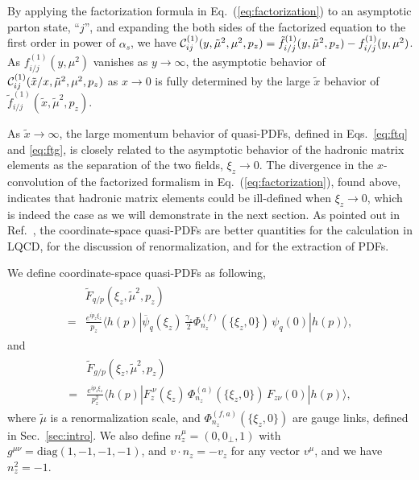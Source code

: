 \documentclass[twocolumn,aps,prd,superscriptaddress,nofootinbib,showpacs]{revtex4}
\begin{document}
By applying the factorization formula in Eq.~(\ref{eq:factorization}) to an asymptotic parton state, ``$j$'', and expanding the both sides of the factorized equation to the first order in power of $\alpha_s$, we have ${\cal C}^{(1)}_{ij}(y,\tilde{\mu}^2,\mu^2,p_z)=\tilde{f}^{(1)}_{i/j}(y,\tilde{\mu}^2,p_z) - f^{(1)}_{i/j}(y,\mu^2)$. As $f^{(1)}_{i/j}(y,\mu^2)$ vanishes as $y\to\infty$, the asymptotic behavior of ${\cal C}^{(1)}_{ij}(\tilde{x}/x,\tilde{\mu}^2,\mu^2,p_z)$ as $x\to 0$ is fully determined by the large $\tilde{x}$ behavior of $\tilde{f}^{(1)}_{i/j}(\tilde{x},\tilde{\mu}^2,p_z)$.

As $\tilde{x}\to\infty$, the large momentum behavior of quasi-PDFs, defined in Eqs.~\eqref{eq:ftq} and \eqref{eq:ftg}, is closely related to the asymptotic behavior of the hadronic matrix elements as the separation of the two fields, $\xi_z\to 0$.  The divergence in the $x$-convolution of the factorized formalism in Eq.~(\ref{eq:factorization}), found above, indicates that hadronic matrix elements could be ill-defined when $\xi_z\to 0$, which is indeed the case as we will demonstrate in the next section.  As pointed out in Ref.~\cite{Ma:2014jla}, the coordinate-space quasi-PDFs are better quantities for the calculation in LQCD, for the discussion of renormalization, and for the extraction of PDFs.

We define coordinate-space quasi-PDFs as following,
\begin{align}\label{eq:ftqx}
\begin{split}
&\tilde{F}_{q/p}(\xi_z,\tilde{\mu}^2,p_z)\\
=& \frac{e^{i p_z \xi_z}}{p_z} \langle h(p)| \overline{\psi}_q(\xi_z)\,\frac{\gamma_z}{2}
\Phi_{n_z}^{(f)}(\{\xi_z,0\})\, \psi_q(0) | h(p) \rangle,
\end{split}
\end{align}
and
\begin{align}\label{eq:ftgx}
\begin{split}
&\tilde{F}_{g/p}(\xi_z,\tilde{\mu}^2,p_z)\\
=&\frac{e^{i p_z \xi_z}}{p_z^2}\langle h(p)| F_{z}^{\ \nu}(\xi_z)\,
\Phi_{n_z}^{(a)}(\{\xi_z,0\})\, F_{z\nu}(0) | h(p) \rangle,
\end{split}
\end{align}
where $\tilde{\mu}$ is a renormalization scale, and $\Phi_{n_z}^{(f,a)}(\{\xi_z,0\})$ are gauge links, defined in Sec.~\ref{sec:intro}. We also define $n_z^\mu = (0,0_\perp, 1)$ with $g^{\mu\nu}=\text{diag}(1,-1,-1,-1)$, and $v\cdot n_z =- v_z$ for any vector $v^\mu$, and we have $n_z^2 = -1$.
\end{document}
